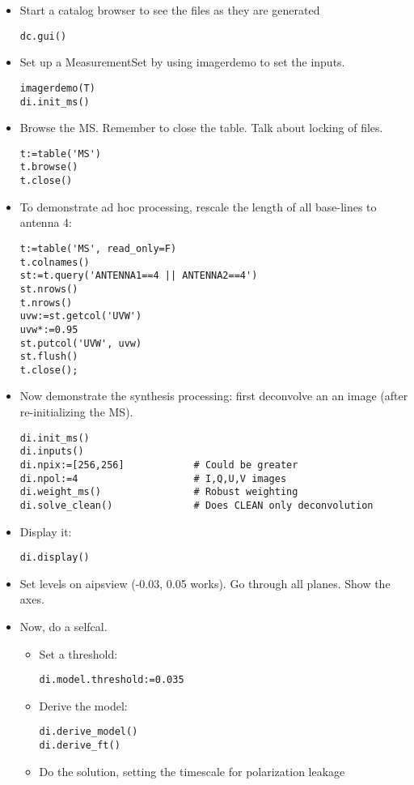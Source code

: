 \begin{itemize}
\item Start a catalog browser to see the files as they are generated
\begin{verbatim}
dc.gui()
\end{verbatim}
\item Set up a MeasurementSet by using imagerdemo to set the inputs.
\begin{verbatim}
imagerdemo(T)
di.init_ms()
\end{verbatim}
\item Browse the MS. Remember to close the table. Talk about
locking of files.
\begin{verbatim}
t:=table('MS')
t.browse()
t.close()
\end{verbatim}
\item To demonstrate ad hoc processing, rescale the length
of all base-lines to antenna 4:
\begin{verbatim}
t:=table('MS', read_only=F)
t.colnames()
st:=t.query('ANTENNA1==4 || ANTENNA2==4')
st.nrows()
t.nrows()
uvw:=st.getcol('UVW')
uvw*:=0.95
st.putcol('UVW', uvw)
st.flush()
t.close();
\end{verbatim}
\item Now demonstrate the synthesis processing: first deconvolve an an image
(after re-initializing the MS).
\begin{verbatim}
di.init_ms()
di.inputs()
di.npix:=[256,256]            # Could be greater
di.npol:=4                    # I,Q,U,V images
di.weight_ms()                # Robust weighting
di.solve_clean()              # Does CLEAN only deconvolution
\end{verbatim}
\item Display it:
\begin{verbatim}
di.display()
\end{verbatim}
\item Set levels on aipsview (-0.03, 0.05 works). Go through all planes. Show the axes.
\item Now, do a selfcal.
\begin{itemize}
\item Set a threshold: 
\begin{verbatim}
di.model.threshold:=0.035
\end{verbatim}
\item Derive the model: 
\begin{verbatim}
di.derive_model()
di.derive_ft()
\end{verbatim}
\item Do the solution, setting the timescale for polarization leakage

\end{itemize}
\end{itemize}
